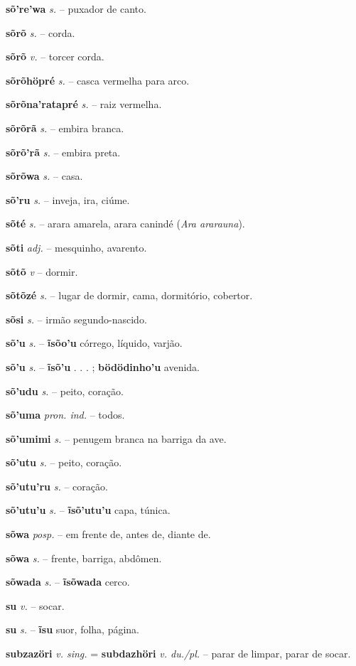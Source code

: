 \textbf{sõ're'wa} \textit{s.} -- puxador de canto.

\textbf{sõrõ} \textit{s.} -- corda.

\textbf{sõrõ} \textit{v.} -- torcer corda.

\textbf{sõrõhöpré} \textit{s.} --  casca vermelha para arco.

\textbf{sõrõna'ratapré} \textit{s.} -- raiz vermelha.

\textbf{sõrõrã} \textit{s.} -- embira branca.

\textbf{sõrõ'rã} \textit{s.} -- embira preta.

\textbf{sõrõwa} \textit{s.} -- casa.

\textbf{sõ'ru} \textit{s.} -- inveja, ira, ciúme.

\textbf{sõté} \textit{s.} -- arara amarela, arara canindé (\textit{Ara ararauna}).

\textbf{sõti} \textit{adj.} -- mesquinho, avarento.

\textbf{sõtõ} \textit{v} -- dormir.

\textbf{sõtõzé} \textit{s.} -- lugar de dormir, cama, dormitório, cobertor.

\textbf{sõsi} \textit{s.} -- irmão segundo-nascido.

\textbf{sõ'u} \textit{s.} -- \textbf{ĩsõo'u} córrego, líquido, varjão.

\textbf{sõ'u} \textit{s.} -- \textbf{ĩsõ'u} . . . ; \textbf{bödödinho'u} avenida.

\textbf{sõ'udu} \textit{s.} -- peito, coração.

\textbf{sõ'uma} \textit{pron. ind.} -- todos.

\textbf{sõ'umimi} \textit{s.} -- penugem branca na barriga da ave.

\textbf{sõ'utu} \textit{s.} -- peito, coração.

\textbf{sõ'utu'ru} \textit{s.} -- coração.

\textbf{sõ'utu'u} \textit{s.} -- \textbf{ĩsõ'utu'u} capa, túnica.

\textbf{sõwa} \textit{posp.} -- em frente de, antes de, diante de.

\textbf{sõwa} \textit{s.} -- frente, barriga, abdômen.

\textbf{sõwada} \textit{s.} -- \textbf{ĩsõwada} cerco.

\textbf{su} \textit{v.} -- socar.

\textbf{su} \textit{s.} -- \textbf{ĩsu} suor, folha, página.

\textbf{subzazöri} \textit{v. sing.} = \textbf{subdazhöri} \textit{v. du./pl.} -- parar de limpar, parar de socar.

